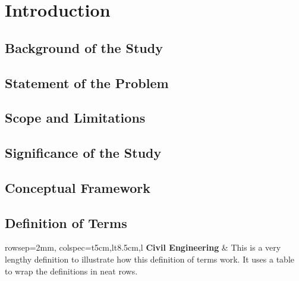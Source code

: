\chapter{Introduction}\label{ch:1}

\section{Background of the Study}\label{sec:1-bos}

\section{Statement of the Problem}\label{sec:1-sop}

\section{Scope and Limitations}\label{sec:1-sal}

\section{Significance of the Study}\label{sec:1-sots}

\section{Conceptual Framework}\label{sec:1-cf}

\section{Definition of Terms}\label{sec:1-dot}
\vspace*{-2em}
\begin{longtblr}[
	entry=none,
	label=none
	]{rowsep=2mm, colspec={t{5cm,l}t{8.5cm,l}}}
	\textbf{Civil Engineering} & This is a very lengthy definition to illustrate how this definition of terms work. It uses a table to wrap the definitions in neat rows. \\
\end{longtblr}

